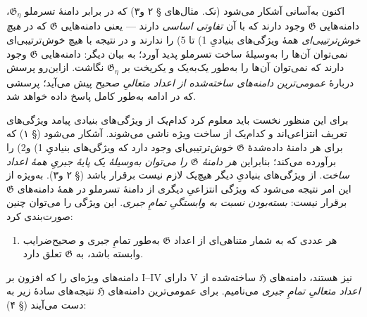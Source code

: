 \documentclass[11pt]{article}
\newcommand{\srcLTR}[1]{\relax\ifmmode\text{\mbox{\babelsublr{\foreignlanguage{english}{#1}}}}\else\babelsublr{\foreignlanguage{english}{#1}}\fi}
\newcommand{\srcfn}[2]{\begingroup\renewcommand{\thefootnote}{\srcLTR{#1}}\footnote{#2}\addtocounter{footnote}{-1}\endgroup}
\begin{document}
اکنون به‌آسانی آشکار می‌شود (نک. مثال‌های § ۲ و۳) که در برابر دامنهٔ تسرملو
$\mathfrak G_\eta$، دامنه‌هایی $\mathfrak G$ وجود دارند که با آن
\emph{تفاوتی اساسی} دارند --- یعنی دامنه‌هایی $\mathfrak G$ که در
\emph{هیچ خوش‌ترتیبی‌ای} همهٔ ویژگی‌های بنیادیِ 1) تا 5) را ندارند و در
نتیجه با هیچ خوش‌ترتیبی‌ای نمی‌توان آن‌ها را به‌وسیلهٔ ساخت تسرملو پدید آورد؛
به بیان دیگر: دامنه‌هایی $\mathfrak G$ وجود دارند که نمی‌توان آن‌ها را
به‌طور یک‌به‌یک و یکریخت بر $\mathfrak G_\eta$ نگاشت. ازاین‌رو پرسش دربارهٔ
\emph{عمومی‌ترین دامنه‌های ساخته‌شده از اعداد متعالیِ صحیح} پیش می‌آید؛
پرسشی که در ادامه به‌طور کامل پاسخ داده خواهد شد.

برای این منظور نخست باید معلوم کرد کدام‌یک از ویژگی‌های بنیادی پیامد
ویژگی‌های تعریف انتزاعی‌اند و کدام‌یک از ساخت ویژه ناشی می‌شوند. آشکار می‌شود
(§ ۱) که برای هر دامنهٔ داده‌شدهٔ $\mathfrak G$ خوش‌ترتیبی‌ای وجود دارد که
ویژگی‌های بنیادیِ 1) و2) را برآورده می‌کند؛ بنابراین \emph{هر دامنهٔ
$\mathfrak G$ را می‌توان به‌وسیلهٔ یک پایهٔ جبریِ همهٔ اعداد ساخت}. از
ویژگی‌های بنیادیِ دیگر هیچ‌یک لازم نیست برقرار باشد (§ ۲ و۳). به‌ویژه از این
امر نتیجه می‌شود که ویژگی انتزاعیِ دیگری از دامنهٔ تسرملو در همهٔ دامنه‌های
$\mathfrak G$ برقرار نیست: \emph{بسته‌بودن نسبت به وابستگیِ تمامِ جبری}.
این ویژگی را می‌توان چنین صورت‌بندی کرد:
\begin{enumerate}
\item[V.] هر عددی که به شمار متناهی‌ای از اعداد $\mathfrak G$ به‌طور
تمامِ جبری و صحیح‌ضرایب وابسته باشد، به $\mathfrak G$ تعلق دارد.
\end{enumerate}

دامنه‌های ویژه‌ای را که افزون بر I--IV دارای V نیز هستند، دامنه‌های
$\mathfrak H$ ساخته‌شده از \emph{اعداد متعالیِ تمامِ جبری} می‌نامیم. برای
عمومی‌ترین دامنه‌های $\mathfrak H$ نتیجه‌های سادهٔ زیر به دست می‌آیند (§ ۴):
\end{document}
